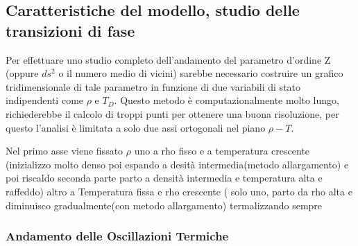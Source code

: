 \documentclass[11pt]{article}
\theoremstyle{plain}
\theoremstyle{remark}
\begin{document}
\clearpage
\subsection{Caratteristiche del modello, studio delle transizioni di fase}
Per effettuare uno studio completo dell'andamento del parametro d'ordine Z (oppure $ds^2$ o il numero medio di vicini) sarebbe necessario costruire un grafico tridimensionale di tale parametro in funzione di due variabili di stato indipendenti come $\rho$ e $T_D$.
Questo metodo è computazionalmente molto lungo, richiederebbe il calcolo di troppi punti per ottenere una buona risoluzione, per questo l'analisi è limitata a solo due assi ortogonali nel piano $\rho-T$.

Nel primo asse viene fissato $\rho$
uno a rho fisso e a temperatura crescente (inizializzo molto denso poi  espando a desità intermedia(metodo allargamento) e poi riscaldo
seconda parte parto a densità intermedia e temperatura alta e raffeddo)
altro a Temperatura fissa e rho crescente ( solo uno, parto da rho alta e diminuisco gradualmente(con metodo allargamento) termalizzando sempre

\subsubsection{Andamento delle Oscillazioni Termiche}
\end{document}
